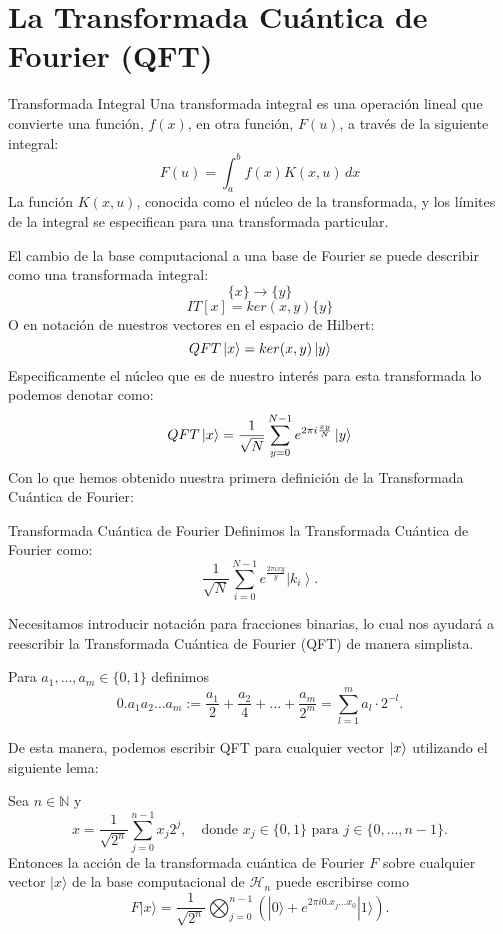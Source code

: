 \documentclass{article}
\begin{document}
\section{La Transformada Cuántica de Fourier (QFT)}

\begin{mydef}{Transformada Integral}{}
    Una transformada integral es una operación lineal que convierte una función, \(f(x)\), en otra función, \(F(u)\), a través de la siguiente integral:
\[ F(u) = \int_{a}^{b} f(x) K(x,u) \, dx \]
La función \(K(x,u)\), conocida como el núcleo de la transformada, y los límites de la integral se especifican para una transformada particular.
\end{mydef}
\noindent El cambio de la base computacional a una base de Fourier se puede describir
como una transformada integral:
\[\{x\}\to\{y\}\]
\[IT[x] = ker(x,y)\{y\}\]
O en notación de nuestros vectores en el espacio de Hilbert:
\[QFT\ket{x} = ker(x,y)\ket{y}\]
Especificamente el núcleo que es de nuestro interés para esta transformada lo podemos
denotar como:
\[QFT\ket{x}=\frac{1}{\sqrt{N}}\sum_{y=0}^{N-1}e^{2\pi i \frac{xy}{N}}\ket{y}\]
Con lo que hemos obtenido nuestra primera definición de la Transformada Cuántica de Fourier:
\begin{mydef}{Transformada Cuántica de Fourier}{}
    Definimos la Transformada Cuántica de Fourier como:
    \[\frac{1}{\sqrt{N}} \sum_{i=0}^{N-1} e^{\frac{2\pi i x y}{y}} \left| k_i \right\rangle.\]
\end{mydef}
Necesitamos introducir notación para fracciones binarias,
lo cual nos ayudará a reescribir la Transformada Cuántica de Fourier (QFT)
de manera simplista.
\begin{mydef}{}{}
    Para $a_1, \ldots, a_m \in \{0, 1\}$ definimos
\[
0.a_1a_2 \ldots a_m := \frac{a_1}{2} + \frac{a_2}{4} + \ldots + \frac{a_m}{2^m} =
\sum_{l=1}^{m} a_l \cdot 2^{-l}.
\]
\end{mydef}
De esta manera, podemos escribir QFT para cualquier vector \(\ket{x}\) utilizando el 
siguiente lema:
\begin{mylem}{}{}
    Sea $n \in \mathbb{N}$ y
    \[
    x = \frac{1}{\sqrt{2^n}} \sum_{j=0}^{n-1} x_j 2^j, \quad \text{donde } x_j \in \{0, 1\} \text{ para } j \in \{0, \ldots, n-1\}.
    \]
    Entonces la acción de la transformada cuántica de Fourier $F$ sobre cualquier vector $|x\rangle$ de la base computacional de $\mathcal{H}_n$ puede escribirse como
    \[
    F|x\rangle = \frac{1}{\sqrt{2^n}} \bigotimes_{j=0}^{n-1} \left( |0\rangle + e^{2\pi i 0.x_j \ldots x_0} |1\rangle \right).
    \]
\end{mylem}
\end{document}
